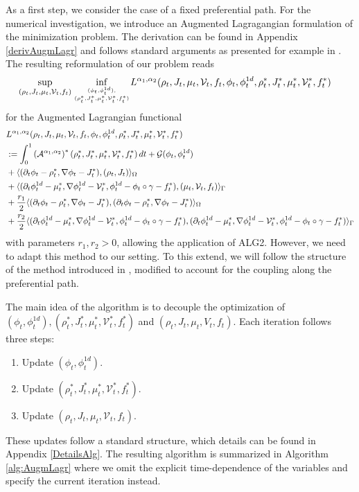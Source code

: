 \documentclass{article}
\def\calA{{\mathcal A}} \def\calB{{\mathcal B}} \def\calC{{\mathcal C}}
\def\calG{{\mathcal G}} \def\calH{{\mathcal H}} \def\calI{{\mathcal I}}
\DeclarePairedDelimiter{\skp}{\langle}{\rangle}
\begin{document}
As a first step, we consider the case of a fixed preferential path. 
For the numerical investigation, we introduce an Augmented Lagragangian formulation of the minimization problem. The derivation can be found in Appendix \ref{derivAugmLagr} and follows standard arguments as presented for example in \cite{fu_high_2023}. The resulting reformulation of our problem reads 
\begin{align}\label{eq:OptAugmL}
    \sup\limits_{(\rho_t, J_t, \mu_t, \mathcal{V}_t, f_t)} \inf\limits_{\genfrac{}{}{0pt}{}{(\phi_t, \phi_t^{1d}),}{(\rho_t^*, J_t^*, \mu_t^*, \mathcal{V}_t^*, f_t^*)}} &L^{\alpha_1, \alpha_2}(\rho_t, J_t, \mu_t, \mathcal{V}_t, f_t, \phi_t, \phi_t^{1d}, \rho_t^*, J_t^*, \mu_t^*, \mathcal{V}_t^*, f_t^*)
\end{align}
for the Augmented Lagrangian functional 
\begin{align*}
    &L^{\alpha_1, \alpha_2}(\rho_t, J_t, \mu_t, \mathcal{V}_t, f_t, \phi_t, \phi_t^{1d}, \rho_t^*, J_t^*, \mu_t^*, \mathcal{V}_t^*, f_t^*)\\
    &:= \int_0^1\left(\calA^{\alpha_1, \alpha_2}\right)^*(\rho_t^*, J_t^*, \mu_t^*, \mathcal{V}_t^*, f_t^*)  \, dt + \calG(\phi_t, \phi_t^{1d}) \\
    &+ \skp{(\partial_t\phi_t - \rho_t^*,\nabla\phi_t - J_t^*),(\rho_t, J_t)}_\Omega \\
    &+ \skp{(\partial_t\phi_t^{1d} - \mu_t^*, \nabla\phi_t^{1d} - \mathcal{V}_t^*, \phi_t^{1d}-\phi_t\circ\gamma - f_t^*),(\mu_t, \mathcal{V}_t, f_t)}_\Gamma \\
    &+ \frac{r_1}{2} \skp{(\partial_t\phi_t - \rho_t^*,\nabla\phi_t - J_t^*),(\partial_t\phi_t - \rho_t^*,\nabla\phi_t - J_t^*)}_\Omega \\
    &+ \frac{r_2}{2} \skp{(\partial_t\phi_t^{1d} - \mu_t^*, \nabla\phi_t^{1d} - \mathcal{V}_t^*, \phi_t^{1d}-\phi_t\circ\gamma - f_t^*),(\partial_t\phi_t^{1d} - \mu_t^*, \nabla\phi_t^{1d} - \mathcal{V}_t^*, \phi_t^{1d}-\phi_t\circ\gamma - f_t^*)}_\Gamma
\end{align*}
with parameters $r_1, r_2>0$, allowing the application of ALG2. However, we need to adapt this method to our setting.
To this extend, we will follow the structure of the method introduced in \cite{benamou2000computational}, modified to account for the coupling along the preferential path. 

The main idea of the algorithm is to decouple the optimization of $(\phi_t, \phi_t^{1d}), (\rho_t^*, J_t^*, \mu_t^*, \mathcal{V}_t^*, f_t^*)$ and $(\rho_t, J_t, \mu_t, V_t, f_t)$. 
Each iteration follows three steps:
\begin{enumerate}
    \item Update $(\phi_t, \phi_t^{1d})$.
    \item Update $(\rho_t^*, J_t^*, \mu_t^*, \mathcal{V}_t^*, f_t^*)$.
    \item Update $(\rho_t, J_t, \mu_t, \mathcal{V}_t, f_t)$.
\end{enumerate}
These updates follow a standard structure, which details can be found in Appendix \ref{DetailsAlg}. The resulting algorithm is summarized in Algorithm \ref{alg:AugmLagr} where we omit the explicit time-dependence of the variables and specify the current iteration instead.
\end{document}
